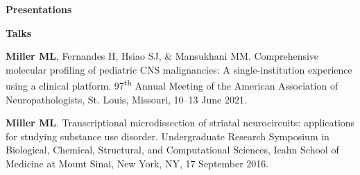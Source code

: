 \documentclass[10pt]{article}
\begin{document}
\vspace{0.1in}

{\large \textbf{Presentations}}
\begin{description}
\item \textbf{Talks}
\item[\quad] \textbf{Miller ML}, Fernandes H, Hsiao SJ, \& Mansukhani MM. Comprehensive molecular profiling of pediatric CNS malignancies: A single-institution experience using a clinical platform. 97\textsuperscript{th} Annual Meeting of the American Association of Neuropathologists, St. Louis, Missouri, 10--13 June 2021.
\item[\quad] \textbf{Miller ML}. Transcriptional microdissection of striatal neurocircuits: applications for studying substance use disorder. Undergraduate Research Symposium in Biological, Chemical, Structural, and Computational Sciences, Icahn School of Medicine at Mount Sinai, New York, NY, 17 September 2016.
\end{description}
\end{document}
